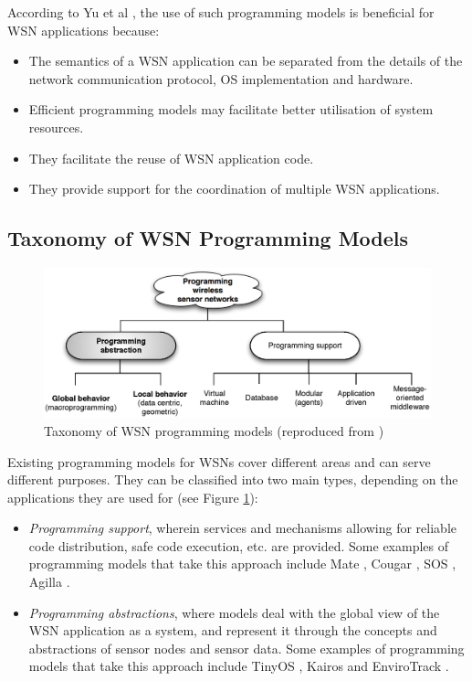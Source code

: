 According to Yu et al \cite{yu_issuesMiddleware:2004}, the use of such
programming models is beneficial for WSN applications because:
\begin{itemize}
\item The semantics of a WSN application can be separated from the details of 
the network communication protocol, OS implementation and hardware.
\item Efficient programming models may facilitate better utilisation of system 
resources.
\item They facilitate the reuse of WSN application code.
\item They provide support for the coordination of multiple WSN applications.
\end{itemize}

\subsection{Taxonomy of WSN Programming Models}

\begin{figure}
\centering
\includegraphics[width=\textwidth]{img/ProgrammingAbstractions.eps} 
\caption[Taxonomy of WSN programming models]{Taxonomy of WSN programming models (reproduced from
\cite{hadim_middleware:2006})}
\label{Fig:ProgrammingModels}
\end{figure}

Existing programming models for WSNs cover different areas and can serve 
different purposes. They can be classified into two main types, depending on 
the applications they are used for  \cite{hadim_middleware:2006} (see Figure
\ref{Fig:ProgrammingModels}):
\begin{itemize}
\item \emph{Programming support}, wherein services and mechanisms allowing for 
reliable code distribution, safe code execution, etc. are provided. Some
examples of programming models that take this approach include Mate
\cite{Levis_Mate:2002}, Cougar \cite{Bonnet_Cougar:2001}, SOS
\cite{Han_SOS:2005}, Agilla \cite{Fok_Agilla:2005}.
\item \emph{Programming abstractions}, where models deal with the global view 
of the WSN application as a system, and represent it through the concepts and 
abstractions of sensor nodes and sensor data. Some
examples of programming models that take this approach include TinyOS
\cite{levis_tinyOS:2005}, Kairos \cite{gummadi_Kairos:2005} and
EnviroTrack \cite{Abdelzaher_EnviroTrack:2004}.
\end{itemize}


